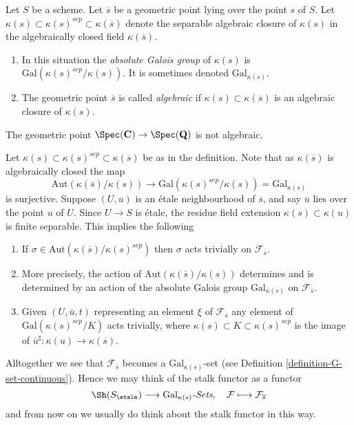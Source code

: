 \begin{definition}
\label{definition-algebraic-geometric-point}
Let $S$ be a scheme.
Let $\overline{s}$ be a geometric point lying over the point $s$ of $S$.
Let $\kappa(s) \subset \kappa(s)^{sep} \subset \kappa(\overline{s})$
denote the separable algebraic closure of $\kappa(s)$ in the algebraically
closed field $\kappa(\overline{s})$.
\begin{enumerate}
\item In this situation the {\it absolute Galois group} of $\kappa(s)$
is $\text{Gal}(\kappa(s)^{sep}/\kappa(s))$. It is sometimes denoted
$\text{Gal}_{\kappa(s)}$.
\item The geometric point $\overline{s}$ is called
{\it algebraic} if $\kappa(s) \subset \kappa(\overline{s})$ is
an algebraic closure of $\kappa(s)$.
\end{enumerate}
\end{definition}

\begin{example}
\label{example-stupid}
The geometric point
$\Spec(\mathbf{C}) \to \Spec(\mathbf{Q})$
is not algebraic.
\end{example}

\noindent
Let $\kappa(s) \subset \kappa(s)^{sep} \subset \kappa(\overline{s})$
be as in the definition. Note that as $\kappa(\overline{s})$ is algebraically
closed the map
$$
\text{Aut}(\kappa(\overline{s})/\kappa(s))
\longrightarrow
\text{Gal}(\kappa(s)^{sep}/\kappa(s)) = \text{Gal}_{\kappa(s)}
$$
is surjective. Suppose $(U, \overline{u})$ is an
\'etale neighbourhood of $\overline{s}$, and say $\overline{u}$ lies over
the point $u$ of $U$. Since $U \to S$ is \'etale, the residue field extension
$\kappa(s) \subset \kappa(u)$ is finite separable.
This implies the following
\begin{enumerate}
\item If $\sigma \in \text{Aut}(\kappa(\overline{s})/\kappa(s)^{sep})$
then $\sigma$ acts trivially on $\mathcal{F}_{\overline{s}}$.
\item More precisely, the action of
$\text{Aut}(\kappa(\overline{s})/\kappa(s))$
determines and is determined by an action of the absolute Galois group
$\text{Gal}_{\kappa(s)}$ on $\mathcal{F}_{\overline{s}}$.
\item Given $(U, \overline{u}, t)$ representing an element $\xi$ of
$\mathcal{F}_{\overline{s}}$ any element of
$\text{Gal}(\kappa(s)^{sep}/K)$ acts trivially, where
$\kappa(s) \subset K \subset \kappa(s)^{sep}$ is the image of
$\overline{u}^\sharp : \kappa(u) \to \kappa(\overline{s})$.
\end{enumerate}
Alltogether we see that $\mathcal{F}_{\overline{s}}$ becomes a
$\text{Gal}_{\kappa(s)}$-set (see
Definition \ref{definition-G-set-continuous}).
Hence we may think of the stalk functor as a functor
$$
\Sh(S_\etale) \longrightarrow
\text{Gal}_{\kappa(s)}\textit{-Sets},
\quad
\mathcal{F} \longmapsto \mathcal{F}_{\overline{s}}
$$
and from now on we usually do think about the stalk functor in this way.

